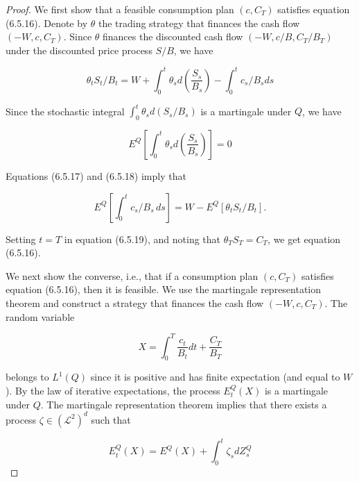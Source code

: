 \documentclass[\topdir/lecture\_notes.tex]{subfiles}
\begin{document}
\begin{proof}
We first show that a feasible consumption plan $\left(c, C_{T}\right)$ satisfies equation (6.5.16). Denote by $\theta$ the trading strategy that finances the cash flow $\left(-W, c, C_{T}\right)$. Since $\theta$ finances the discounted cash flow $\left(-W, c / B, C_{T} / B_{T}\right)$ under the discounted price process $S / B$, we have

\begin{equation}
\theta_{t} S_{t}/B_{t}=W+\int_{0}^{t} \theta_{s} d\left(\frac{S_{s}}{B_{s}}\right)-\int_{0}^{t} c_{s}/B_{s} d s \label{eq:6.5.17}
\end{equation}

Since the stochastic integral $\int_{0}^{t} \theta_{s} d\left(S_{s} / B_{s}\right)$ is a martingale under $Q$, we have

\begin{equation}
E^{Q}\left[\int_{0}^{t} \theta_{s} d\left(\frac{S_{s}}{B_{s}}\right)\right]=0 \label{eq:6.5.18}
\end{equation}

Equations (6.5.17) and (6.5.18) imply that

\begin{equation}
E^{Q}\!\left[\int_{0}^{t} c_{s}/B_{s} \, d s\right]=W-E^{Q}\!\left[\theta_{t} S_{t}/B_{t}\right]. \label{eq:6.5.19}
\end{equation}

Setting $t=T$ in equation (6.5.19), and noting that $\theta_{T} S_{T}=C_{T}$, we get equation (6.5.16).

We next show the converse, i.e., that if a consumption plan $\left(c, C_{T}\right)$ satisfies equation (6.5.16), then it is feasible. We use the martingale representation theorem and construct a strategy that finances the cash flow $\left(-W, c, C_{T}\right)$. The random variable

\begin{equation}
X=\int_{0}^{T} \frac{c_{t}}{B_{t}} d t+\frac{C_{T}}{B_{T}}
\end{equation}

belongs to $L^{1}(Q)$ since it is positive and has finite expectation (and equal to $W$ ). By the law of iterative expectations, the process $E_{t}^{Q}(X)$ is a martingale under $Q$. The martingale representation theorem implies that there exists a process $\zeta \in\left(\mathcal{L}^{2}\right)^{d}$ such that

\begin{equation}
E_{t}^{Q}(X)=E^{Q}(X)+\int_{0}^{t} \zeta_{s} d Z_{s}^{Q} \label{eq:6.5.20}
\end{equation}


\end{proof}
\end{document}
